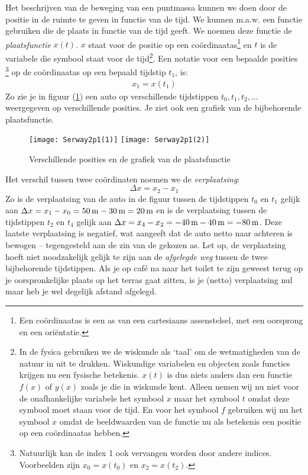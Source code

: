 \documentclass{ximera}
\begin{document}
	Het beschrijven van de beweging van een puntmassa kunnen we doen door de positie in de ruimte te geven in functie van de tijd. We kunnen m.a.w. een functie gebruiken die de plaats in functie van de tijd geeft. We noemen deze functie de \emph{plaatsfunctie} $x(t)$. $x$ staat voor de positie op een co\"ordinaatas\footnote{Een co\"ordinaatas is een as van een cartesiaans assenstelsel, met een oorsprong en een ori\"entatie.} en $t$ is de variabele die symbool staat voor de tijd\footnote{In de fysica gebruiken we de wiskunde als `taal' om de wetmatigheden van de natuur in uit te drukken. Wiskundige variabelen en objecten zoals functies krijgen nu een fysische betekenis. $x(t)$ is dus niets anders dan een functie $f(x)$ of $y(x)$ zoals je die in wiskunde kent. Alleen nemen wij nu niet voor de onafhankelijke variabele het symbool $x$ maar het symbool $t$ omdat deze symbool moet staan voor de tijd. En voor het symbool $f$ gebruiken wij nu het symbool $x$ omdat de beeldwaarden van de functie nu als betekenis een positie op een co\"ordinaatas hebben.}. Een notatie voor een bepaalde posities \footnote{Natuurlijk kan de index 1 ook vervangen worden door andere indices. Voorbeelden zijn $x_0=x(t_0)$ en $x_2=x(t_2)$.} op de co\"ordinaatas op een bepaald tijdstip $t_1$, is:
	\begin{eqnarray*}
	x_1=x(t_1)
	\end{eqnarray*}
	Zo zie je in figuur (\ref{grafplaatsfunctie}) een auto op verschillende tijdstippen $t_0,t_1, t_2,\ldots$ weer\-ge\-ge\-ven op verschillende posities. Je ziet ook een grafiek van de bijbehorende plaatsfunctie.
	
	\begin{figure}[h]
	\hfill
	\texttt{[image: Serway2p1(1)]}
	\hfill
	\texttt{[image: Serway2p1(2)]}
	\hfill
	\caption{Verschillende posities en de grafiek van de plaatsfunctie}
	\label{grafplaatsfunctie}
	\end{figure}
	
	Het verschil tussen twee co\"ordinaten noemen we de \emph{verplaatsing}:
	\[
	\Delta x = x_2-x_1
	\]
	Zo is de verplaatsing van de auto in de figuur tussen de tijdstippen $t_0$ en $t_1$ gelijk aan $\Delta x = x_1-x_0=50\rm\,m-30\rm\,m=20\rm\,m$ en is de verplaatsing tussen de tijdstippen $t_2$ en $t_4$ gelijk aan $\Delta x=x_4-x_2=-40\rm\,m-40\rm\,m=-80\rm\,m$. Deze laatste verplaatsing is negatief, wat aangeeft dat de auto netto naar achteren is bewogen -- tegengesteld aan de zin van de gekozen as.
	\newline
	Let op, de verplaatsing hoeft niet noodzakelijk gelijk te zijn aan de \emph{afgelegde weg} tussen de twee bijbehorende tijdstippen. Als je op caf\'e na naar het toilet te zijn geweest terug op je oorspronkelijke plaats op het terras gaat zitten, is je (netto) verplaatsing nul maar heb je wel degelijk afstand afgelegd.
	
\end{document}
